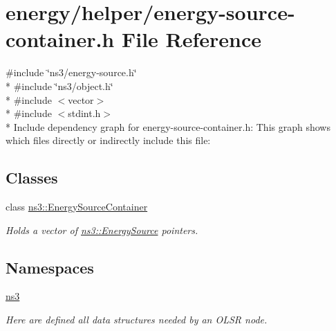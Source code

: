 \hypertarget{energy-source-container_8h}{}\section{energy/helper/energy-\/source-\/container.h File Reference}
\label{energy-source-container_8h}
{\ttfamily \#include \char`\"{}ns3/energy-\/source.\+h\char`\"{}}\\*
{\ttfamily \#include \char`\"{}ns3/object.\+h\char`\"{}}\\*
{\ttfamily \#include $<$vector$>$}\\*
{\ttfamily \#include $<$stdint.\+h$>$}\\*
Include dependency graph for energy-\/source-\/container.h\+:
This graph shows which files directly or indirectly include this file\+:
\subsection*{Classes}
\begin{DoxyCompactItemize}
\item 
class \hyperlink{classns3_1_1EnergySourceContainer}{ns3\+::\+Energy\+Source\+Container}
\begin{DoxyCompactList}\small\item\em Holds a vector of \hyperlink{classns3_1_1EnergySource}{ns3\+::\+Energy\+Source} pointers. \end{DoxyCompactList}\end{DoxyCompactItemize}
\subsection*{Namespaces}
\begin{DoxyCompactItemize}
\item 
 \hyperlink{namespacens3}{ns3}
\begin{DoxyCompactList}\small\item\em Here are defined all data structures needed by an O\+L\+SR node. \end{DoxyCompactList}\end{DoxyCompactItemize}
